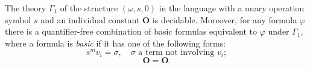 The theory $\Gamma_1$ of the structure $(\omega, s, 0)$ in the language with a unary operation symbol $s$ and an individual constant $\mathbf{O}$ is decidable. Moreover, for any formula $\varphi$ there is a quantifier-free combination of basic formulas equivalent to $\varphi$ under $\Gamma_1$, where a formula is \emph{basic} if it has one of the following forms:
$$s^m v_i = \sigma, \quad \sigma \text{ a term not involving } v_i;$$
$$\mathbf{O} = \mathbf{O}.$$

